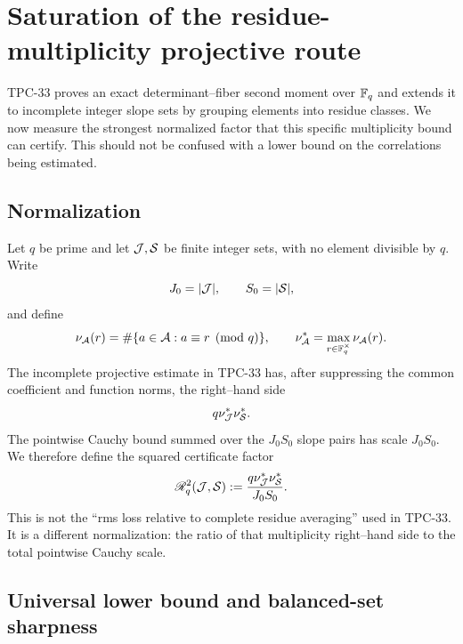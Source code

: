 \section{Saturation of the residue-multiplicity projective route}
\label{sec:tpc35-projective-saturation}

TPC-33 proves an exact determinant--fiber second moment over
\(\mathbb F_q\) and extends it to incomplete integer slope sets by grouping
elements into residue classes.  We now measure the strongest normalized
factor that this specific multiplicity bound can certify.  This should not
be confused with a lower bound on the correlations being estimated.

\subsection{Normalization}

Let \(q\) be prime and let \(\mathcal J,\mathcal S\) be finite integer sets, with no
element divisible by \(q\).  Write
\begin{equation}
 J_0=|\mathcal J|,\qquad S_0=|\mathcal S|,
 \label{eq:tpc35-set-sizes}
\end{equation}
and define
\begin{equation}
 \nu_{\mathcal A}(r)=\#\{a\in\mathcal A:a\equiv r\pmod q\},\qquad
 \nu_{\mathcal A}^*=\max_{r\in\mathbb F_q^\times}\nu_{\mathcal A}(r).
 \label{eq:tpc35-residue-multiplicity}
\end{equation}
The incomplete projective estimate in TPC-33 has, after suppressing the
common coefficient and function norms, the right--hand side
\[
 q\nu_{\mathcal J}^*\nu_{\mathcal S}^*.
\]
The pointwise Cauchy bound summed over the \(J_0S_0\) slope pairs has
scale \(J_0S_0\).  We therefore define the squared certificate factor
\begin{equation}
 \mathscr R_q^2(\mathcal J,\mathcal S)
 :=\frac{q\nu_{\mathcal J}^*\nu_{\mathcal S}^*}{J_0S_0}.
 \label{eq:tpc35-certificate-factor}
\end{equation}
This is not the ``rms loss relative to complete residue averaging'' used
in TPC-33.  It is a different normalization: the ratio of that
multiplicity right--hand side to the total pointwise Cauchy scale.

\subsection{Universal lower bound and balanced-set sharpness}

